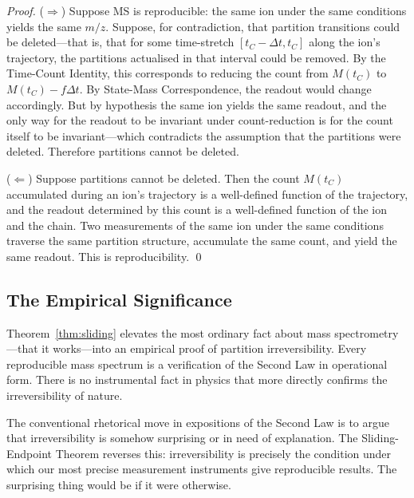 \documentclass[twocolumn,10pt,a4paper]{article}
\theoremstyle{definition}
\theoremstyle{remark}
\newcommand{\Mcount}{M}
\begin{document}
\begin{proof}
($\Rightarrow$) Suppose MS is reproducible: the same ion under the same conditions yields the same $m/z$. Suppose, for contradiction, that partition transitions could be deleted---that is, that for some time-stretch $[t_C - \Delta t, t_C]$ along the ion's trajectory, the partitions actualised in that interval could be removed. By the Time-Count Identity, this corresponds to reducing the count from $\Mcount(t_C)$ to $\Mcount(t_C) - f\Delta t$. By State-Mass Correspondence, the readout would change accordingly. But by hypothesis the same ion yields the same readout, and the only way for the readout to be invariant under count-reduction is for the count itself to be invariant---which contradicts the assumption that the partitions were deleted. Therefore partitions cannot be deleted.

($\Leftarrow$) Suppose partitions cannot be deleted. Then the count $\Mcount(t_C)$ accumulated during an ion's trajectory is a well-defined function of the trajectory, and the readout determined by this count is a well-defined function of the ion and the chain. Two measurements of the same ion under the same conditions traverse the same partition structure, accumulate the same count, and yield the same readout. This is reproducibility. \qed
\end{proof}

\subsection{The Empirical Significance}

Theorem~\ref{thm:sliding} elevates the most ordinary fact about mass spectrometry---that it works---into an empirical proof of partition irreversibility. Every reproducible mass spectrum is a verification of the Second Law in operational form. There is no instrumental fact in physics that more directly confirms the irreversibility of nature.

The conventional rhetorical move in expositions of the Second Law is to argue that irreversibility is somehow surprising or in need of explanation. The Sliding-Endpoint Theorem reverses this: irreversibility is precisely the condition under which our most precise measurement instruments give reproducible results. The surprising thing would be if it were otherwise.
\end{document}
